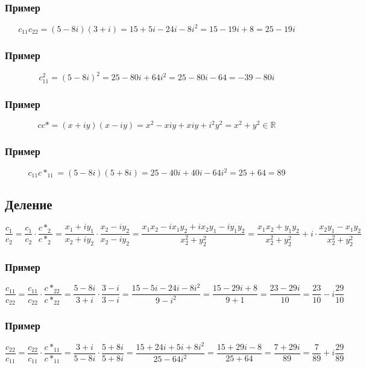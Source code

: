 \documentclass{article}
\begin{document}
\subsubsection{Пример}
\[
    c_{11} c_{22} = (5 - 8i)(3 + i) = 15 + 5i - 24i - 8i^2 = 15 - 19i + 8 = 25 - 19i
\]

\subsubsection{Пример}
\[
    c^2_{11} = (5 - 8i)^2 = 25 - 80i + 64i^2 = 25 - 80i - 64 = -39 - 80i
\]

\subsubsection{Пример}
\[
    c c* = (x + iy)(x - iy) = x^2 - xiy + xiy + i^2 y^2 = x^2 + y^2 \in \mathbb{R}
\]

\subsubsection{Пример}
\[
    c_{11} c*_{11} = (5 - 8i)(5 + 8i) = 25 - 40i + 40i - 64i^2 = 25 + 64 = 89
\]


\subsection{Деление}
\[
    \frac{c_1}{c_2} = 
    \frac{c_1}{c_2} \cdot \frac{c*_2}{c*_2} = 
    \frac{x_1 + iy_1}{x_2 + iy_2} \cdot \frac{x_2 - iy_2}{x_2 - iy_2} =
    \frac{x_1 x_2 - i x_1 y_2 + i x_2 y_1 - i y_1 y_2}{x^2_2 + y^2_2} =
    \frac{x_1 x_2 + y_1 y_2}{x^2_2 + y^2_2} + i \cdot \frac{x_2 y_1 - x_1 y_2}{x^2_2 + y^2_2}
\]

\subsubsection{Пример}
\[
    \frac{c_{11}}{c_{22}} = 
    \frac{c_{11}}{c_{22}} \cdot \frac{c*_{22}}{c*_{22}} =
    \frac{5 - 8i}{3 + i} \cdot \frac{3 - i}{3 - i} =
    \frac{15 - 5i - 24i - 8i^2}{9 - i^2} =
    \frac{15 - 29i + 8}{9 + 1} =
    \frac{23 - 29i}{10} =
    \frac{23}{10} - i \frac{29}{10}
\]

\subsubsection{Пример}
\[
    \frac{c_{22}}{c_{11}} = 
    \frac{c_{22}}{c_{11}} \cdot \frac{c*_{11}}{c*_{11}} =
    \frac{3 + i}{5 - 8i} \cdot \frac{5 + 8i}{5 + 8i} =
    \frac{15 + 24i + 5i + 8i^2}{25 - 64i^2} =
    \frac{15 + 29i - 8}{25 + 64} =
    \frac{7 + 29i}{89} =
    \frac{7}{89} + i \frac{29}{89}
\]
\end{document}
